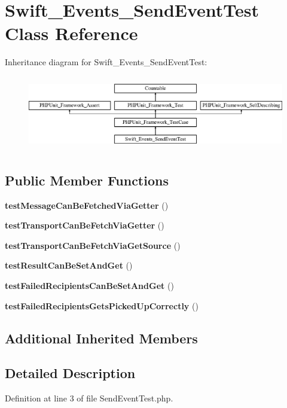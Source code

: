 \section{Swift\+\_\+\+Events\+\_\+\+Send\+Event\+Test Class Reference}
\label{class_swift___events___send_event_test}
Inheritance diagram for Swift\+\_\+\+Events\+\_\+\+Send\+Event\+Test\+:\begin{figure}[H]
\begin{center}
\leavevmode
\includegraphics[height=3.303835cm]{class_swift___events___send_event_test}
\end{center}
\end{figure}
\subsection*{Public Member Functions}
\begin{DoxyCompactItemize}
\item 
{\bf test\+Message\+Can\+Be\+Fetched\+Via\+Getter} ()
\item 
{\bf test\+Transport\+Can\+Be\+Fetch\+Via\+Getter} ()
\item 
{\bf test\+Transport\+Can\+Be\+Fetch\+Via\+Get\+Source} ()
\item 
{\bf test\+Result\+Can\+Be\+Set\+And\+Get} ()
\item 
{\bf test\+Failed\+Recipients\+Can\+Be\+Set\+And\+Get} ()
\item 
{\bf test\+Failed\+Recipients\+Gets\+Picked\+Up\+Correctly} ()
\end{DoxyCompactItemize}
\subsection*{Additional Inherited Members}


\subsection{Detailed Description}


Definition at line 3 of file Send\+Event\+Test.\+php.



